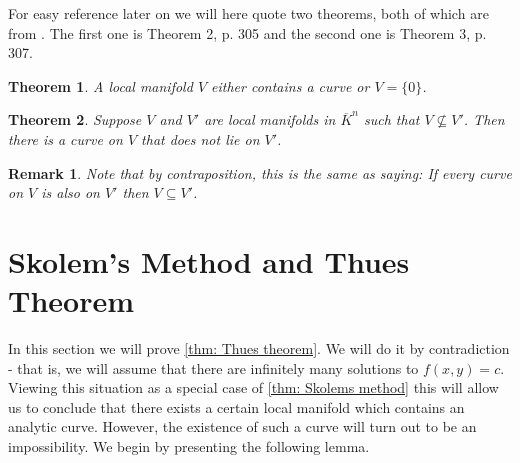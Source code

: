 \documentclass{article}
\newtheorem{theorem}{Theorem}[section]
\newtheorem{lemma}{Lemma}[section]
\newtheorem{remark}{Remark}[section]
\numberwithin{equation}{section}
\begin{document}
% 


For easy reference later on we will here quote two theorems, both of which are from \citep{borevich}. The first one is Theorem 2, p. 305 and the second one is Theorem 3, p. 307. 

\begin{theorem}\label{thm: The shape of a manifold}
    A local manifold $V$ either contains a curve or $V = \{ 0 \}$.
\end{theorem}
\begin{theorem}\label{thm: One manifold is contained in another}
    Suppose $V$ and $V'$ are local manifolds in $\overline K^n$ such that $V \nsubseteq V'$. Then there is a curve on $V$ that does not lie on $V'$.
\end{theorem}
\begin{remark}\label{remark: One manifold is contained in another}
    Note that by contraposition, this is the same as saying: If every curve on $V$ is also on $V'$ then $V \subseteq V'$.
\end{remark}

\section{Skolem's Method and Thues Theorem}\label{section: skolem and thue}
In this section we will prove \cref{thm: Thues theorem}. We will do it by contradiction - that is, we will assume that there are infinitely many solutions to $f(x, y) = c$. Viewing this situation as a special case of \cref{thm: Skolems method} this will allow us to conclude that there exists a certain local manifold which contains an analytic curve. However, the existence of such a curve will turn out to be an impossibility. We begin by presenting the following lemma.
\end{document}
